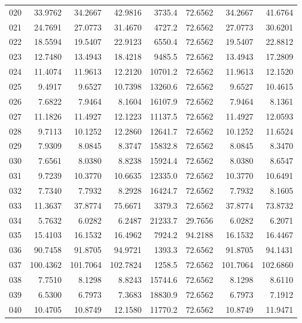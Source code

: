 \begin{longtable}{rrrrrrrr}
020 & 33.9762 & 34.2667 & 42.9816 & 3735.4 & 72.6562 & 34.2667 & 41.6764\\
021 & 24.7691 & 27.0773 & 31.4670 & 4727.2 & 72.6562 & 27.0773 & 30.6201\\
022 & 18.5594 & 19.5407 & 22.9123 & 6550.4 & 72.6562 & 19.5407 & 22.8812\\
023 & 12.7480 & 13.4943 & 18.4218 & 9485.5 & 72.6562 & 13.4943 & 17.2809\\
024 & 11.4074 & 11.9613 & 12.2120 & 10701.2 & 72.6562 & 11.9613 & 12.1520\\
025 & 9.4917 & 9.6527 & 10.7398 & 13260.6 & 72.6562 & 9.6527 & 10.4615\\
026 & 7.6822 & 7.9464 & 8.1604 & 16107.9 & 72.6562 & 7.9464 & 8.1361\\
027 & 11.1826 & 11.4927 & 12.1223 & 11137.5 & 72.6562 & 11.4927 & 12.0593\\
028 & 9.7113 & 10.1252 & 12.2860 & 12641.7 & 72.6562 & 10.1252 & 11.6524\\
029 & 7.9309 & 8.0845 & 8.3747 & 15832.8 & 72.6562 & 8.0845 & 8.3470\\
030 & 7.6561 & 8.0380 & 8.8238 & 15924.4 & 72.6562 & 8.0380 & 8.6547\\
031 & 9.7239 & 10.3770 & 10.6635 & 12335.0 & 72.6562 & 10.3770 & 10.6491\\
032 & 7.7340 & 7.7932 & 8.2928 & 16424.7 & 72.6562 & 7.7932 & 8.1605\\
033 & 11.3637 & 37.8774 & 75.6671 & 3379.3 & 72.6562 & 37.8774 & 73.8732\\
034 & 5.7632 & 6.0282 & 6.2487 & 21233.7 & 29.7656 & 6.0282 & 6.2071\\
035 & 15.4103 & 16.1532 & 16.4962 & 7924.2 & 94.2188 & 16.1532 & 16.4467\\
036 & 90.7458 & 91.8705 & 94.9721 & 1393.3 & 72.6562 & 91.8705 & 94.1431\\
037 & 100.4362 & 101.7064 & 102.7824 & 1258.5 & 72.6562 & 101.7064 & 102.6860\\
038 & 7.7510 & 8.1298 & 8.8243 & 15744.6 & 72.6562 & 8.1298 & 8.6110\\
039 & 6.5300 & 6.7973 & 7.3683 & 18830.9 & 72.6562 & 6.7973 & 7.1912\\
040 & 10.4705 & 10.8749 & 12.1580 & 11770.2 & 72.6562 & 10.8749 & 11.9471\\
\end{longtable}
\endgroup
